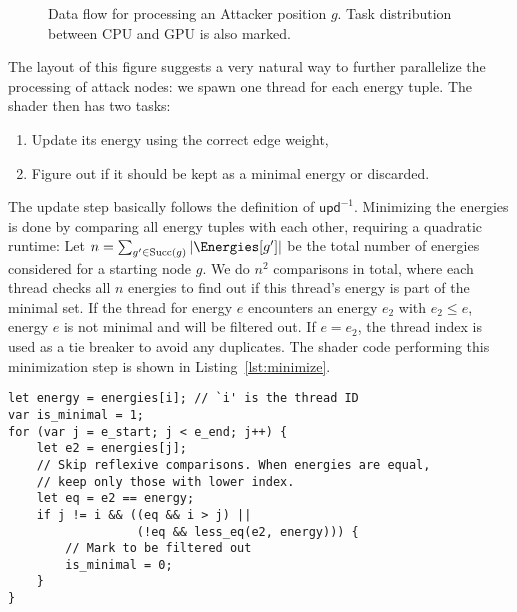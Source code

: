 \begin{figure}[ht]
\begin{center}
\end{center}
\caption{Data flow for processing an Attacker position $g$.
    Task distribution between CPU and GPU is also marked.
}%
\label{fig:attack}
\end{figure}

The layout of this figure suggests a very natural way to further parallelize
the processing of attack nodes:
we spawn one thread for each energy tuple.
The shader then has two tasks:
\begin{enumerate}
    \item Update its energy using the correct edge weight,
    \item Figure out if it should be kept as a minimal energy or discarded.
\end{enumerate}

The update step basically follows the definition of $\mathsf{upd}^{-1}$.
Minimizing the energies is done by comparing all energy tuples with each other,
requiring a quadratic runtime:
Let $n = \sum_{g' \in \mathrm{Succ}(g)} | \Energies[g'] |$ be the total number
of energies considered for a starting node $g$.
We do $n^2$ comparisons in total, where each thread checks all $n$
energies to find out if this thread's energy is part of the minimal set.
If the thread for energy $e$ encounters an energy $e_2$ with $e_2 \leq e$,
energy $e$ is not minimal and will be filtered out. If $e = e_2$, the thread
index is used as a tie breaker to avoid any duplicates.
The shader code performing this minimization step is shown in
Listing~\ref{lst:minimize}.

\begin{lstlisting}[language=WGSL,float,
    caption={WGSL Shader Code for minimizing energies.
        \texttt{i} is the thread ID
        and determines the energy that this thread processes.
        It is compared against energies at index \texttt{j},
        which loops through the range of energies to minimize,
        denoted by \texttt{e\_start} and \texttt{e\_end}.
        The function \texttt{less\_eq} is shown in Listing~\ref{lst:less_eq}.},
    label=lst:minimize]
let energy = energies[i]; // `i' is the thread ID
var is_minimal = 1;
for (var j = e_start; j < e_end; j++) {
    let e2 = energies[j];
    // Skip reflexive comparisons. When energies are equal,
    // keep only those with lower index.
    let eq = e2 == energy;
    if j != i && ((eq && i > j) ||
                  (!eq && less_eq(e2, energy))) {
        // Mark to be filtered out
        is_minimal = 0;
    }
}
\end{lstlisting}

